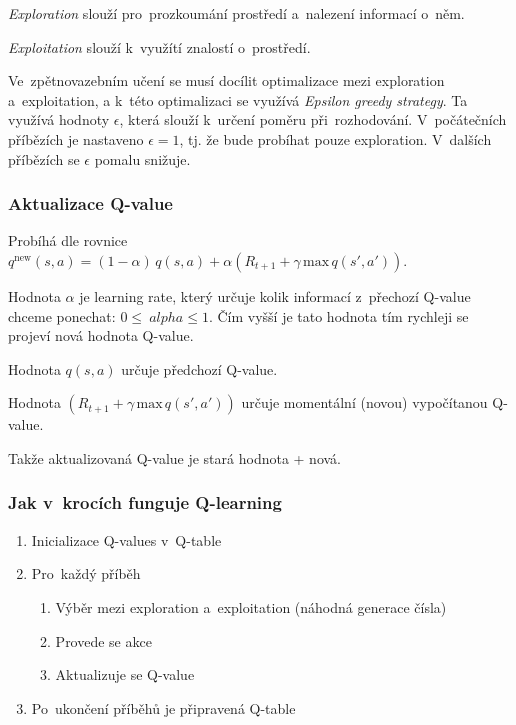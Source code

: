 \emph{Exploration} slouží pro~prozkoumání prostředí a~nalezení informací o~něm.

\emph{Exploitation} slouží k~využítí znalostí o~prostředí.

Ve~zpětnovazebním učení se musí docílit optimalizace mezi exploration a~exploitation, a k~této optimalizaci se využívá \emph{Epsilon greedy strategy}.
Ta využívá hodnoty $\epsilon$, která slouží k~určení poměru při~rozhodování.
V~počátečních příbězích je nastaveno $\epsilon = 1$, tj. že bude probíhat pouze exploration.
V~dalších příbězích se $\epsilon$ pomalu snižuje.

\subsubsection{Aktualizace Q-value}

Probíhá dle rovnice
$q^\text{new}(s,a) = (1-\alpha)\, q(s,a) + \alpha \left(R_{t+1} + \gamma\,\text{max}\,q(s',a')\right)$.

Hodnota $\alpha$ je learning rate, který určuje kolik informací z~přechozí Q-value chceme ponechat: $0 \leq\ alpha \leq 1$.
Čím vyšší je tato hodnota tím rychleji se projeví nová hodnota Q-value.

Hodnota $q(s,a)$ určuje předchozí Q-value.

Hodnota $\left(R_{t+1} + \gamma\,\text{max}\,q(s',a')\right)$ určuje momentální (novou) vypočítanou Q-value.

Takže aktualizovaná Q-value je stará hodnota + nová.

\subsubsection{Jak v~krocích funguje Q-learning}

\begin{enumerate}
    \item Inicializace Q-values v~Q-table
    \item Pro~každý příběh
    \begin{enumerate}
    	\item Výběr mezi exploration a~exploitation (náhodná generace čísla)
    	\item Provede se akce
    	\item Aktualizuje se Q-value
    \end{enumerate}
    \item Po~ukončení příběhů je připravená Q-table
\end{enumerate}


